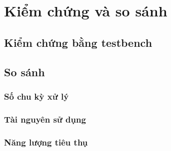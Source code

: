 \section{Kiểm chứng và so sánh}

\subsection{Kiểm chứng bằng testbench}

\subsection{So sánh}

\subsubsection{Số chu kỳ xử lý}

\subsubsection{Tài nguyên sử dụng}

\subsubsection{Năng lượng tiêu thụ}